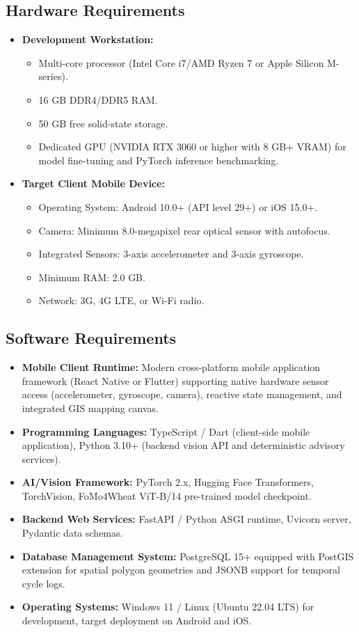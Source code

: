 \subsection{Hardware Requirements}
\begin{itemize}
    \item \textbf{Development Workstation:}
    \begin{itemize}
        \item Multi-core processor (Intel Core i7/AMD Ryzen 7 or Apple Silicon M-series).
        \item 16 GB DDR4/DDR5 RAM.
        \item 50 GB free solid-state storage.
        \item Dedicated GPU (NVIDIA RTX 3060 or higher with 8 GB+ VRAM) for model fine-tuning and PyTorch inference benchmarking.
    \end{itemize}
    \item \textbf{Target Client Mobile Device:}
    \begin{itemize}
        \item Operating System: Android 10.0+ (API level 29+) or iOS 15.0+.
        \item Camera: Minimum 8.0-megapixel rear optical sensor with autofocus.
        \item Integrated Sensors: 3-axis accelerometer and 3-axis gyroscope.
        \item Minimum RAM: 2.0 GB.
        \item Network: $3\text{G}$, $4\text{G}$ LTE, or Wi-Fi radio.
    \end{itemize}
\end{itemize}

\subsection{Software Requirements}
\begin{itemize}
    \item \textbf{Mobile Client Runtime:} Modern cross-platform mobile application framework (React Native or Flutter) supporting native hardware sensor access (accelerometer, gyroscope, camera), reactive state management, and integrated GIS mapping canvas.
    \item \textbf{Programming Languages:} TypeScript / Dart (client-side mobile application), Python 3.10+ (backend vision API and deterministic advisory services).
    \item \textbf{AI/Vision Framework:} PyTorch 2.x, Hugging Face Transformers, TorchVision, FoMo4Wheat ViT-B/14 pre-trained model checkpoint.
    \item \textbf{Backend Web Services:} FastAPI / Python ASGI runtime, Uvicorn server, Pydantic data schemas.
    \item \textbf{Database Management System:} PostgreSQL 15+ equipped with PostGIS extension for spatial polygon geometries and JSONB support for temporal cycle logs.
    \item \textbf{Operating Systems:} Windows 11 / Linux (Ubuntu 22.04 LTS) for development, target deployment on Android and iOS.
\end{itemize}

